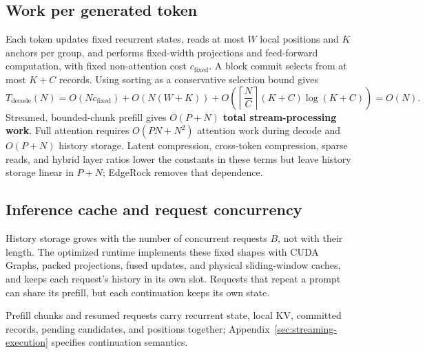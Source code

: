 \subsection{Work per generated token}
Each token updates fixed recurrent states, reads at most $W$ local positions and $K$ anchors per group, and performs fixed-width projections and feed-forward computation, with fixed non-attention cost $c_{\mathrm{fixed}}$. A block commit selects from at most $K+C$ records. Using sorting as a conservative selection bound gives
\begin{equation}
T_{\mathrm{decode}}(N)=O(Nc_{\mathrm{fixed}})+O\!\left(N(W+K)\right)
+O\!\left(\left\lceil\frac{N}{C}\right\rceil(K+C)\log(K+C)\right)=O(N).
\end{equation}
Streamed, bounded-chunk prefill gives \textbf{$O(P+N)$ total stream-processing work}. Full attention requires $O(PN+N^2)$ attention work during decode and $O(P+N)$ history storage. Latent compression, cross-token compression, sparse reads, and hybrid layer ratios lower the constants in these terms but leave history storage linear in $P+N$; EdgeRock removes that dependence.

\subsection{Inference cache and request concurrency}
History storage grows with the number of concurrent requests $B$, not with their length. The optimized runtime implements these fixed shapes with CUDA Graphs, packed projections, fused updates, and physical sliding-window caches, and keeps each request's history in its own slot. Requests that repeat a prompt can share its prefill, but each continuation keeps its own state.

Prefill chunks and resumed requests carry recurrent state, local KV, committed records, pending candidates, and positions together; Appendix~\ref{sec:streaming-execution} specifies continuation semantics.
